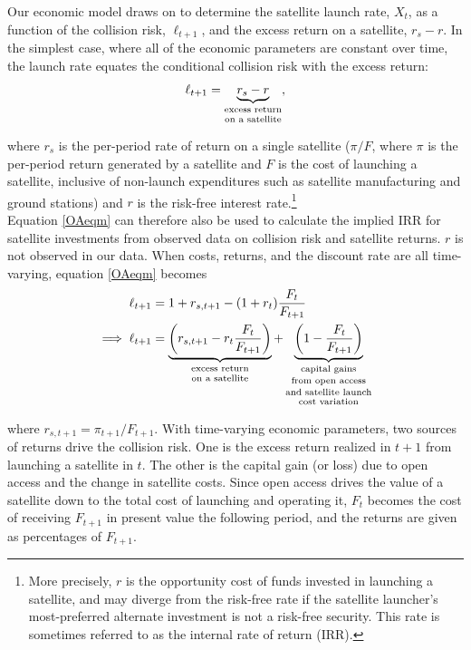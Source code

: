 \documentclass[12pt]{article}
\begin{document}
Our economic model draws on \cite{raorondinaWP} to determine the satellite launch rate, $X_t$, as a function of the collision risk, $\ell_{t+1}$, and the excess return on a satellite, $r_{s} - r$. In the simplest case, where all of the economic parameters are constant over time, the launch rate equates the conditional collision risk with the excess return:
\begin{equation}
\label{OAeqm}
\ell_{t+1} = \underbrace{r_s - r}_{\text{\shortstack{excess return\\on a satellite}}},
\end{equation}

where $r_s$ is the per-period rate of return on a single satellite ($\pi/F$, where $\pi$ is the per-period return generated by a satellite and $F$ is the cost of launching a satellite, inclusive of non-launch expenditures such as satellite manufacturing and ground stations) and $r$ is the risk-free interest rate.\footnote{More precisely, $r$ is the opportunity cost of funds invested in launching a satellite, and may diverge from the risk-free rate if the satellite launcher's most-preferred alternate investment is not a risk-free security. This rate is sometimes referred to as the internal rate of return (IRR).} \\

Equation \ref{OAeqm} can therefore also be used to calculate the implied IRR for satellite investments from observed data on collision risk and satellite returns. $r$ is not observed in our data. When costs, returns, and the discount rate are all time-varying, equation \ref{OAeqm} becomes
\begin{align}
\label{OAeqm2}
\ell_{t+1} &= 1+ r_{s,t+1} - (1+r_t) \frac{F_t}{F_{t+1}} \\
\implies \ell_{t+1} &= \underbrace{\left( r_{s,t+1} - r_t \frac{F_t}{F_{t+1}} \right)}_{\text{\shortstack{excess return\\on a satellite}}} + \underbrace{\left(1 - \frac{F_t}{F_{t+1}} \right)}_{\text{\shortstack{capital gains\\from open access\\and satellite launch\\cost variation}}} 
\end{align}

where $r_{s,t+1} = \pi_{t+1}/F_{t+1}$. With time-varying economic parameters, two sources of returns drive the collision risk. One is the excess return realized in $t+1$ from launching a satellite in $t$. The other is the capital gain (or loss) due to open access and the change in satellite costs. Since open access drives the value of a satellite down to the total cost of launching and operating it, $F_t$ becomes the cost of receiving $F_{t+1}$ in present value the following period, and the returns are given as percentages of $F_{t+1}$. \\
\end{document}
